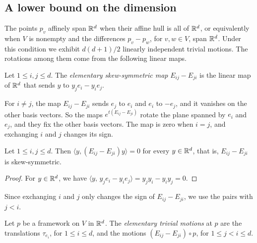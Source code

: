 \subsection{A lower bound on the dimension}
\label{sec:trivial-motions-d-general}

The points $p_v$ affinely span ${\mathbb{R}}^{d}$ when their affine hull is all
of ${\mathbb{R}}^{d}$, or equivalently when $V$ is nonempty and the differences
$p_v - p_w$, for $v, w \in V$, span ${\mathbb{R}}^{d}$. Under this condition we
exhibit $d(d+1)/2$ linearly independent trivial motions. The rotations
among them come from the following linear maps.

\begin{definition}
  \label{def:elemSkewMap}
  \leanok
  Let $1 \le i, j \le d$. The \emph{elementary skew-symmetric map}
  $E_{ij} - E_{ji}$ is the linear map of ${\mathbb{R}}^{d}$ that sends $y$ to
  $y_j e_i - y_i e_j$.
\end{definition}
For $i \ne j$, the map $E_{ij} - E_{ji}$ sends $e_j$ to $e_i$ and
$e_i$ to $-e_j$, and it vanishes on the other basis vectors. So the
maps $e^{t(E_{ij} - E_{ji})}$ rotate the plane spanned by $e_i$ and
$e_j$, and they fix the other basis vectors. The map is zero when
$i = j$, and exchanging $i$ and $j$ changes its sign.

\begin{lemma}
  \label{lem:inner-elemSkewMap-self}
  \leanok
  Let $1 \le i, j \le d$. Then
  $\langle y, (E_{ij} - E_{ji}) y \rangle = 0$ for every
  $y \in {\mathbb{R}}^{d}$, that is, $E_{ij} - E_{ji}$ is skew-symmetric.
\end{lemma}
\begin{proof}
  \leanok
  For $y \in {\mathbb{R}}^{d}$, we have
  $\langle y,\, y_j e_i - y_i e_j \rangle = y_j y_i - y_i y_j = 0$.
\end{proof}

Since exchanging $i$ and $j$ only changes the sign of
$E_{ij} - E_{ji}$, we use the pairs with $j < i$.

\begin{definition}
  \label{def:trivialMotionFamily}
  \leanok
  Let $p$ be a framework on $V$ in ${\mathbb{R}}^{d}$. The \emph{elementary
  trivial motions} at $p$ are the translations $\tau_{e_i}$, for
  $1 \le i \le d$, and the motions $(E_{ij} - E_{ji}) \circ p$, for
  $1 \le j < i \le d$.
\end{definition}

